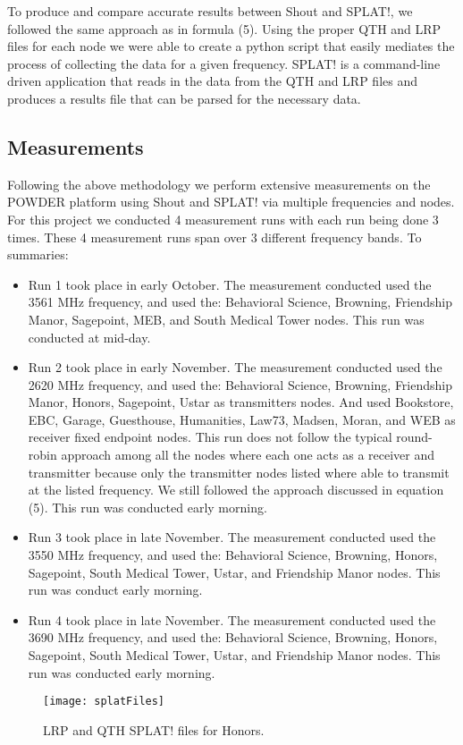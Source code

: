 To produce and compare accurate results between Shout and SPLAT!, we followed the same approach as in formula (5). Using the 
proper QTH and LRP files for each node we were able to create a python script that easily mediates the process of collecting the data
for a given frequency. SPLAT! is a command-line driven application that reads in the data from the QTH and LRP files and produces a 
results file that can be parsed for the necessary data. 

\subsection*{Measurements}
Following the above methodology we perform extensive measurements on the POWDER platform using Shout and SPLAT! via
multiple frequencies and nodes. For this project we conducted 4 measurement runs with each run being done 3 times. These 
4 measurement runs span over 3 different frequency bands. To summaries: 
\begin{itemize}
  \item Run 1 took place in early October. The measurement conducted used the 3561 MHz frequency, and used the: Behavioral Science, Browning, Friendship Manor, Sagepoint, MEB, and South Medical Tower nodes. This run was conducted at mid-day. 
  
  \item Run 2 took place in early November. The measurement conducted used the 2620 MHz frequency, and used the: Behavioral Science, Browning, Friendship Manor, Honors, Sagepoint, Ustar as transmitters nodes. And used Bookstore, EBC, Garage, Guesthouse, Humanities, Law73, Madsen, Moran, and WEB as receiver fixed endpoint nodes. This run does not follow the typical round-robin approach among all the nodes where each one acts as a receiver and transmitter because only the transmitter nodes listed where able to transmit at the listed frequency. We still followed the approach discussed in equation (5).  This run was conducted early morning. 

  
   \item Run 3 took place in late November. The measurement conducted used the 3550 MHz frequency, and used the: Behavioral Science, Browning, Honors, Sagepoint, South Medical Tower, Ustar, and Friendship Manor nodes. This run was conduct early morning. 
      
  \item Run 4 took place in late November. The measurement conducted used the 3690 MHz frequency, and used the: Behavioral Science, Browning, Honors, Sagepoint, South Medical Tower, Ustar, and Friendship Manor nodes. This run was conducted early morning.\end{itemize}

\begin{figure}
  \centering
  \texttt{[image: splatFiles]}
  \caption{LRP and QTH SPLAT! files for Honors.}
  \label{fig:splatFiles}
\end{figure}






